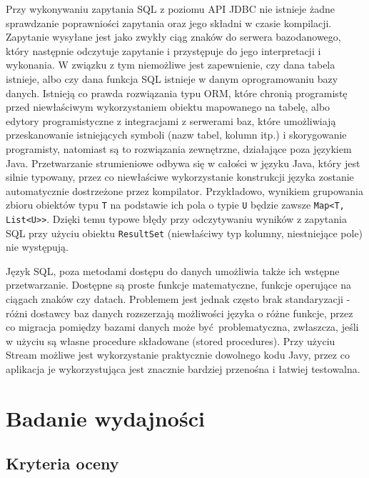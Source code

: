 \documentclass[12pt]{extarticle}
\begin{document}
    Przy wykonywaniu zapytania SQL z poziomu API JDBC nie istnieje żadne sprawdzanie poprawniości zapytania oraz jego składni w czasie kompilacji. Zapytanie wysyłane jest jako zwykły ciąg znaków do serwera bazodanowego, który następnie odczytuje zapytanie i przystępuje do jego interpretacji i wykonania. W związku z tym niemożliwe jest zapewnienie, czy dana tabela istnieje, albo czy dana funkcja SQL istnieje w danym oprogramowaniu bazy danych. Istnieją co prawda rozwiązania typu ORM, które chronią programistę przed niewłaściwym wykorzystaniem obiektu mapowanego na tabelę, albo edytory programistyczne z integracjami z serwerami baz, które umożliwiają przeskanowanie istniejących symboli (nazw tabel, kolumn itp.) i skorygowanie programisty, natomiast są to rozwiązania zewnętrzne, działające poza językiem Java. Przetwarzanie strumieniowe odbywa się w całości w języku Java, który jest silnie typowany, przez co niewłaściwe wykorzystanie konstrukcji języka zostanie automatycznie dostrzeżone przez kompilator. Przykładowo, wynikiem grupowania zbioru obiektów typu \texttt{T} na podstawie ich pola o typie \texttt{U} będzie zawsze \texttt{Map<T, List<U>}\texttt{>}. Dzięki temu typowe błędy przy odczytywaniu wyników z zapytania SQL przy użyciu obiektu \texttt{ResultSet} (niewłaściwy typ kolumny, niestniejące pole) nie występują.

    Język SQL, poza metodami dostępu do danych umożliwia także ich wstępne przetwarzanie. Dostępne są proste funkcje matematyczne, funkcje operujące na ciągach znaków czy datach. Problemem jest jednak często brak standaryzacji - różni dostawcy baz danych rozszerzają możliwości języka o różne funkcje, przez co migracja pomiędzy bazami danych może być problematyczna, zwłaszcza, jeśli w użyciu są własne procedure składowane (stored procedures). Przy użyciu Stream możliwe jest wykorzystanie praktycznie dowolnego kodu Javy, przez co aplikacja je wykorzystująca jest znacznie bardziej przenośna i łatwiej testowalna.
    

\section{Badanie wydajności}

\subsection{Kryteria oceny}
\end{document}
